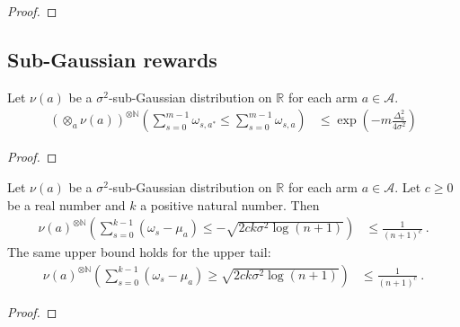 \begin{proof}\leanok

\end{proof}



\subsection{Sub-Gaussian rewards}

\begin{lemma}\label{lem:probReal_sum_le_sum_streamMeasure}
  \leanok
Let $\nu(a)$ be a $\sigma^2$-sub-Gaussian distribution on $\mathbb{R}$ for each arm $a \in \mathcal{A}$.
\begin{align*}
  (\otimes_a \nu(a))^{\otimes \mathbb{N}} \left( \sum_{s=0}^{m-1} \omega_{s, a^*} \le \sum_{s=0}^{m-1} \omega_{s, a} \right)
  &\le \exp\left( -m \frac{\Delta_a^2}{4 \sigma^2} \right)
\end{align*}
\end{lemma}

\begin{proof}\leanok

\end{proof}


\begin{lemma}\label{lem:prob_sum_le_sqrt_log}
  \leanok
Let $\nu(a)$ be a $\sigma^2$-sub-Gaussian distribution on $\mathbb{R}$ for each arm $a \in \mathcal{A}$.
Let $c \ge 0$ be a real number and $k$ a positive natural number.
Then
\begin{align*}
  \nu(a)^{\otimes \mathbb{N}} \left( \sum_{s=0}^{k-1} (\omega_{s} - \mu_a) \le - \sqrt{2 c k \sigma^2 \log(n + 1)} \right)
  &\le \frac{1}{(n + 1)^{c}}
  \: .
\end{align*}
The same upper bound holds for the upper tail:
\begin{align*}
  \nu(a)^{\otimes \mathbb{N}} \left( \sum_{s=0}^{k-1} (\omega_{s} - \mu_a) \ge \sqrt{2 c k \sigma^2 \log(n + 1)} \right)
  &\le \frac{1}{(n + 1)^{c}}
  \: .
\end{align*}
\end{lemma}

\begin{proof}\leanok

\end{proof}
